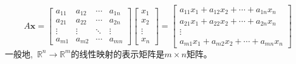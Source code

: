 \documentclass[10pt, a4paper, oneside, fontset=none]{ctexart}
\theoremstyle{plain}
\theoremstyle{definition}
\newcommand{\com}{,\,\,\,\:}
\newcommand{\R}{\mathbb{R}}
\begin{document}
$$A\boldsymbol{x}=\begin{bmatrix}
    a_{11}&a_{12}&\cdots&a_{1n}\\
    a_{21}&a_{22}&\cdots&a_{2n}\\
    \vdots&\vdots&\ddots&\vdots\\
    a_{m1}&a_{m2}&\cdots&a_{mn}
\end{bmatrix}\begin{bmatrix}
    x_1\\x_2\\\vdots\\x_n
\end{bmatrix}=\begin{bmatrix}
        a_{11}x_1+a_{12}x_2+\cdots+a_{1n}x_n\\
        a_{21}x_1+a_{22}x_2+\cdots+a_{2n}x_n\\
        \vdots\\
        a_{m1}x_1+a_{m2}x_2+\cdots+a_{mn}x_n
    \end{bmatrix}$$
一般地\com $\R^n\rightarrow\R^m$的线性映射的表示矩阵是$m\times n$矩阵。
\end{document}
